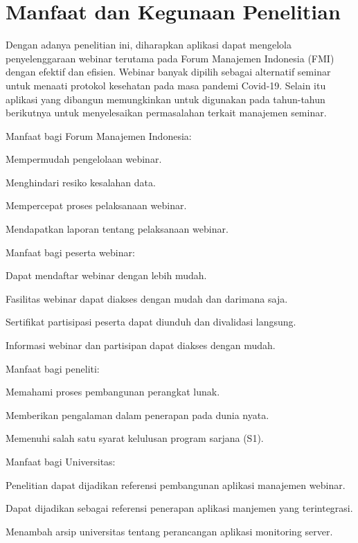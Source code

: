 \section{Manfaat dan Kegunaan Penelitian}

Dengan adanya penelitian ini, diharapkan aplikasi dapat mengelola
penyelenggaraan webinar terutama pada Forum Manajemen Indonesia (FMI) dengan
efektif dan efisien. Webinar banyak dipilih sebagai alternatif seminar untuk
menaati protokol kesehatan pada masa pandemi Covid-19. Selain itu aplikasi yang
dibangun memungkinkan untuk digunakan pada tahun-tahun berikutnya untuk
menyelesaikan permasalahan terkait manajemen seminar.

\begin{ol}
  \item Manfaat bagi Forum Manajemen Indonesia:
    \begin{ol}
      \item Mempermudah pengelolaan webinar.
      \item Menghindari resiko kesalahan data.
      \item Mempercepat proses pelaksanaan webinar.
      \item Mendapatkan laporan tentang pelaksanaan webinar.
    \end{ol}
  \item Manfaat bagi peserta webinar:
    \begin{ol}
      \item Dapat mendaftar webinar dengan lebih mudah.
      \item Fasilitas webinar dapat diakses dengan mudah dan darimana saja.
      \item Sertifikat partisipasi peserta dapat diunduh dan divalidasi langsung.
      \item Informasi webinar dan partisipan dapat diakses dengan mudah.
    \end{ol}
  \item Manfaat bagi peneliti:
    \begin{ol}
      \item Memahami proses pembangunan perangkat lunak.
      \item Memberikan pengalaman dalam penerapan pada dunia nyata.
      \item Memenuhi salah satu syarat kelulusan program sarjana (S1).
    \end{ol}
  \item Manfaat bagi Universitas:
    \begin{ol}
      \item Penelitian dapat dijadikan referensi pembangunan aplikasi manajemen webinar.
      \item Dapat dijadikan sebagai referensi penerapan aplikasi manjemen yang terintegrasi.
      \item Menambah arsip universitas tentang perancangan aplikasi monitoring server.
    \end{ol}
\end{ol}

